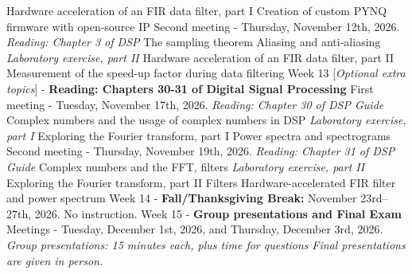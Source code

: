 \documentclass[10pt]{article}
\begin{document}
\begin{outline}[enumerate]
\4 Hardware acceleration of an FIR data filter, part I
\4 Creation of custom PYNQ firmware with open-source IP
\2 Second meeting - Thursday, November 12th, 2026. \textit{Reading: Chapter 3 of DSP}
\3 The sampling theorem
\3 Aliasing and anti-aliasing
\3 \textit{Laboratory exercise, part II}
\4 Hardware acceleration of an FIR data filter, part II
\4 Measurement of the speed-up factor during data filtering
\1 Week 13 [\textit{Optional extra topics}] - \textbf{Reading: Chapters 30-31 of Digital Signal Processing}
\2 First meeting - Tuesday, November 17th, 2026. \textit{Reading: Chapter 30 of DSP Guide}
\3 Complex numbers and the usage of complex numbers in DSP
\3 \textit{Laboratory exercise, part I}
\4 Exploring the Fourier transform, part I
\4 Power spectra and spectrograms
\2 Second meeting - Thursday, November 19th, 2026. \textit{Reading: Chapter 31 of DSP Guide}
\3 Complex numbers and the FFT, filters
\3 \textit{Laboratory exercise, part II}
\4 Exploring the Fourier transform, part II
\4 Filters
\4 Hardware-accelerated FIR filter and power spectrum
\1 Week 14 - \textbf{Fall/Thanksgiving Break:} November 23rd--27th, 2026. No instruction.
\1 Week 15 - \textbf{Group presentations and Final Exam}
\2 Meetings - Tuesday, December 1st, 2026, and Thursday, December 3rd, 2026.
\3 \textit{Group presentations: 15 minutes each, plus time for questions}
\3 \textit{Final presentations are given in person.}
\end{outline}
\end{document}
